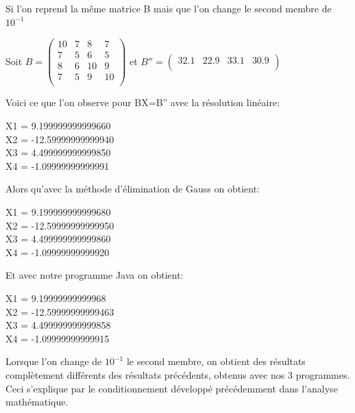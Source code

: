 \documentclass[a4paper,12pt]{report}
\begin{document}
Si l'on reprend la même matrice B mais que l'on change le second membre de $10^{-1}$\\


\begin{center}
	Soit 
	$B=\begin{pmatrix}
	10&7&8&7\\
	7&5&6&5\\
	8&6&10&9\\
	7&5&9&10\\
	\end{pmatrix}$   
	et
	$B''=\begin{pmatrix}
	32.1&22.9&33.1&30.9\\
	\end{pmatrix}$\\
	
\end{center}




Voici ce que l'on observe  pour BX=B'' avec la résolution linéaire:
\begin{center}
	X1 = 9.199999999999660\\
	X2 = -12.59999999999940\\
	X3 = 4.499999999999850\\
	X4 = -1.09999999999991\\
\end{center}

Alors qu'avec la méthode d'élimination de Gauss on obtient:
\begin{center}
	X1 = 9.199999999999680\\
	X2 = -12.59999999999950\\
	X3 = 4.499999999999860\\
	X4 = -1.09999999999920\\
\end{center}

Et avec notre programme Java on obtient:
\begin{center}
	X1 = 9.19999999999968\\
	X2 = -12.59999999999463\\
	X3 = 4.499999999999858\\
	X4 = -1.09999999999915\\
\end{center}

Lorsque l'on change de $10^{-1}$ le second membre, on obtient des résultats complètement différents des résultats précédents, obtenus avec nos 3 programmes. Ceci s'explique par le conditionnement développé précédemment dans l'analyse mathématique.
\end{document}
